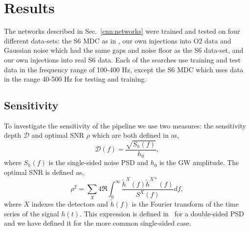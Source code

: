 \section{\label{results}Results}

The networks described in Sec.~\ref{cnn:networks} were trained and tested on four different data-sets: the S6 \ac{MDC} as in \cite{bayley2019SOAPGeneralised,walsh2016ComparisonMethods}, our own injections into O2 data and Gaussian noise which had the same gaps and noise floor as the S6 data-set, and our own injections into real S6 data. 
Each of the searches use training and test data in the frequency range of 100-400 Hz, except the S6 \ac{MDC} which uses data in the range 40-500 Hz for testing and training. 


\subsection{\label{sensitivity} Sensitivity}

To investigate the sensitivity of the pipeline we use two measures: the sensitivity depth $\mathcal{D}$ \cite{prix2007SearchContinuous} and optimal \ac{SNR} $\rho$ \cite{behnke2015PostprocessingMethods} which are both defined in \cite{bayley2019SOAPGeneralised} as,
%
\begin{equation}
\label{sigmoid}
\mathcal{D}(f) = \frac{\sqrt{S_h(f)}}{h_0},
\end{equation}
%
where $S_h(f)$ is the single-sided noise \ac{PSD} and $h_0$ is the \ac{GW} amplitude. The optimal \ac{SNR} is defined as,
%
\begin{equation}
\rho^2 = \sum_X 4
\Re\int^{\infty}_{0}\frac{\tilde{h}^X(f)\tilde{h}^{X*}(f)}{S^X(f)}df,
\end{equation}
%
where $X$ indexes the detectors and $\tilde{h}(f)$ is the Fourier transform of the time series of the signal $h(t)$. 
This expression is defined in~\cite{prix2007SearchContinuous} for a double-sided \ac{PSD} and we have defined it for the more common single-sided case.

